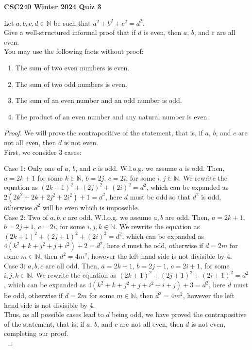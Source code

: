 \documentclass[11pt]{article}
\newcommand{\nats}{\mathbb{N}}
\begin{document}
\begin{center}
{\bf \Large \bf CSC240 Winter 2024 Quiz 3}\\
\end{center}

Let $a,b,c,d \in \nats$ be such that $a^2 + b^2 + c^2 = d^2$.\\

Give a well-structured informal proof that if $d$ is even, then $a$, $b$, and $c$ are all even.\\

You may use the following facts without proof:
\begin{enumerate}
\item The sum of two even numbers is even.
\item The sum of two odd numbers is even.
\item The sum of an even number and an odd number is odd.
\item The product of an even number and any natural number is even.
\end{enumerate}

\begin{proof}
    We will prove the contrapositive of the statement, that is, if $a$, $b$, and $c$ are not all even, then $d$ is not even.\\

    First, we consider 3 cases:

    \setlength{\leftskip}{0.5cm}
    Case 1: Only one of $a$, $b$, and $c$ is odd. W.l.o.g. we assume $a$ is odd. Then, $a=2k+1$ for some $k \in \nats$, $b=2j$, $c=2i$, for some $i,j\in\nats$. We rewrite the equation as $(2k+1)^2+(2j)^2+(2i)^2=d^2$, which can be expanded as $2(2k^2+2k+2j^2+2i^2)+1=d^2$, here $d$ must be odd so that $d^2$ is odd, otherwise $d^2$ will be even which is impossible.\\

    Case 2: Two of $a, b, c$ are odd. W.l.o.g. we assume $a,b$ are odd. Then, $a=2k+1$, $b=2j+1$, $c=2i$, for some $i,j,k\in\nats$. We rewrite the equation as $(2k+1)^2+(2j+1)^2+(2i)^2=d^2$, which can be expanded as $4(k^2+k+j^2+j+i^2)+2=d^2$, here $d$ must be odd, otherwise if $d=2m$ for some $m\in\nats$, then $d^2=4m^2$, however the left hand side is not divisible by 4.\\
    
    Case 3: $a,b,c$ are all odd. Then, $a=2k+1$, $b=2j+1$, $c=2i+1$, for some $i,j,k\in\nats$. We rewrite the equation as $(2k+1)^2+(2j+1)^2+(2i+1)^2=d^2$, which can be expanded as $4(k^2+k+j^2+j+i^2+i+j)+3=d^2$, here $d$ must be odd, otherwise if $d=2m$ for some $m\in\nats$, then $d^2=4m^2$, however the left hand side is not divisible by 4.\\

    \setlength{\leftskip}{0cm}
    Thus, as all possible cases lead to $d$ being odd, we have proved the contrapositive of the statement, that is, if $a$, $b$, and $c$ are not all even, then $d$ is not even, completing our proof.\\
    
\end{proof}
\end{document}
